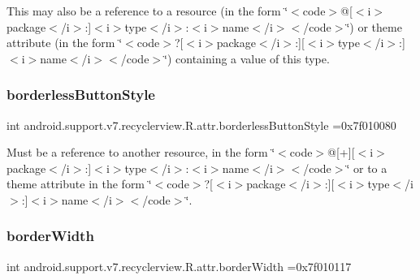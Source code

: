 This may also be a reference to a resource (in the form \char`\"{}$<$code$>$@\mbox{[}$<$i$>$package$<$/i$>$\+:\mbox{]}$<$i$>$type$<$/i$>$\+:$<$i$>$name$<$/i$>$$<$/code$>$\char`\"{}) or theme attribute (in the form \char`\"{}$<$code$>$?\mbox{[}$<$i$>$package$<$/i$>$\+:\mbox{]}\mbox{[}$<$i$>$type$<$/i$>$\+:\mbox{]}$<$i$>$name$<$/i$>$$<$/code$>$\char`\"{}) containing a value of this type. \mbox{\label{classandroid_1_1support_1_1v7_1_1recyclerview_1_1R_1_1attr_ad55f3f1951faef0dc750e8cf4fd67798}} 
\subsubsection{\texorpdfstring{borderless\+Button\+Style}{borderlessButtonStyle}}
{\footnotesize\ttfamily int android.\+support.\+v7.\+recyclerview.\+R.\+attr.\+borderless\+Button\+Style =0x7f010080\hspace{0.3cm}{\ttfamily [static]}}

Must be a reference to another resource, in the form \char`\"{}$<$code$>$@\mbox{[}+\mbox{]}\mbox{[}$<$i$>$package$<$/i$>$\+:\mbox{]}$<$i$>$type$<$/i$>$\+:$<$i$>$name$<$/i$>$$<$/code$>$\char`\"{} or to a theme attribute in the form \char`\"{}$<$code$>$?\mbox{[}$<$i$>$package$<$/i$>$\+:\mbox{]}\mbox{[}$<$i$>$type$<$/i$>$\+:\mbox{]}$<$i$>$name$<$/i$>$$<$/code$>$\char`\"{}. \mbox{\label{classandroid_1_1support_1_1v7_1_1recyclerview_1_1R_1_1attr_a89373d0ecd3f8143500bb95f1faced53}} 
\subsubsection{\texorpdfstring{border\+Width}{borderWidth}}
{\footnotesize\ttfamily int android.\+support.\+v7.\+recyclerview.\+R.\+attr.\+border\+Width =0x7f010117\hspace{0.3cm}{\ttfamily [static]}}

